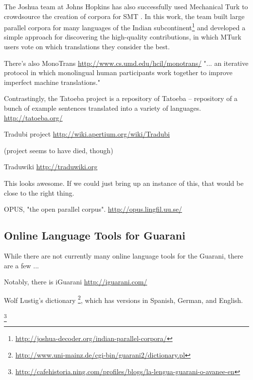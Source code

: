 The Joshua team at Johns Hopkins has also successfully used Mechanical Turk to
crowdsource the creation of corpora for SMT
\cite{post-callisonburch-osborne:2012:WMT}. In this work, the team built
large parallel corpora for many languages of the Indian
subcontinent\footnote{\url{http://joshua-decoder.org/indian-parallel-corpora/}}
and developed a simple approach for discovering the high-quality contributions,
in which MTurk users vote on which translations they consider the best.

There's also MonoTrans
\url{http://www.cs.umd.edu/hcil/monotrans/}
"... an iterative protocol in which monolingual human participants work
together to improve imperfect machine translations." 

Contrastingly, the Tatoeba project is a repository of 
Tatoeba -- repository of a bunch of example sentences translated into a variety
of languages.
\url{http://tatoeba.org/}

Tradubi project
\url{http://wiki.apertium.org/wiki/Tradubi}

(project seems to have died, though)

Traduwiki
\url{http://traduwiki.org}

This looks awesome. If we could just bring up an instance of this, that would
be close to the right thing.

OPUS, "the open parallel corpus".
\url{http://opus.lingfil.uu.se/}

\subsection{Online Language Tools for Guarani}

While there are not currently many online language tools for the Guarani, there
are a few ...

Notably, there is 
iGuarani
\url{http://iguarani.com/}

Wolf Lustig's dictionary
\footnote{\url{http://www.uni-mainz.de/cgi-bin/guarani2/dictionary.pl}}, which
has versions in Spanish, German, and English.


\footnote{\url{http://cafehistoria.ning.com/profiles/blogs/la-lengua-guarani-o-avanee-en}}
